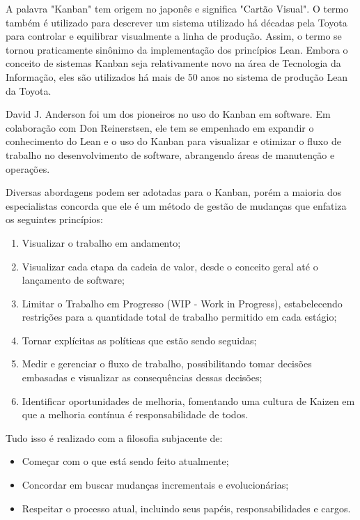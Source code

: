 A palavra "Kanban" tem origem no japonês e significa "Cartão Visual". O termo também é utilizado para descrever um sistema utilizado há décadas pela Toyota para controlar e equilibrar visualmente a linha de produção. Assim, o termo se tornou praticamente sinônimo da implementação dos princípios Lean. Embora o conceito de sistemas Kanban seja relativamente novo na área de Tecnologia da Informação, eles são utilizados há mais de 50 anos no sistema de produção Lean da Toyota.

David J. Anderson foi um dos pioneiros no uso do Kanban em software. Em colaboração com Don Reinerstsen, ele tem se empenhado em expandir o conhecimento do Lean e o uso do Kanban para visualizar e otimizar o fluxo de trabalho no desenvolvimento de software, abrangendo áreas de manutenção e operações.

Diversas abordagens podem ser adotadas para o Kanban, porém a maioria dos especialistas concorda que ele é um método de gestão de mudanças que enfatiza os seguintes princípios:

\begin{enumerate}
	\item Visualizar o trabalho em andamento;
	\item Visualizar cada etapa da cadeia de valor, desde o conceito geral até o lançamento de software;
	\item Limitar o Trabalho em Progresso (WIP - Work in Progress), estabelecendo restrições para a quantidade total de trabalho permitido em cada estágio;
	\item Tornar explícitas as políticas que estão sendo seguidas;
	\item Medir e gerenciar o fluxo de trabalho, possibilitando tomar decisões embasadas e visualizar as consequências dessas decisões;
	\item Identificar oportunidades de melhoria, fomentando uma cultura de Kaizen em que a melhoria contínua é responsabilidade de todos.
\end{enumerate}

Tudo isso é realizado com a filosofia subjacente de:

\begin{itemize}
	\item Começar com o que está sendo feito atualmente;
	\item Concordar em buscar mudanças incrementais e evolucionárias;
	\item Respeitar o processo atual, incluindo seus papéis, responsabilidades e cargos.
\end{itemize}

